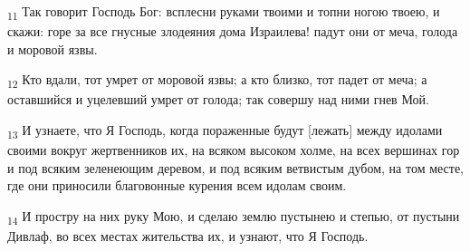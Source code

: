 \begin{tcolorbox}
\textsubscript{11} Так говорит Господь Бог: всплесни руками твоими и топни ногою твоею, и скажи: горе за все гнусные злодеяния дома Израилева! падут они от меча, голода и моровой язвы.
\end{tcolorbox}
\begin{tcolorbox}
\textsubscript{12} Кто вдали, тот умрет от моровой язвы; а кто близко, тот падет от меча; а оставшийся и уцелевший умрет от голода; так совершу над ними гнев Мой.
\end{tcolorbox}
\begin{tcolorbox}
\textsubscript{13} И узнаете, что Я Господь, когда пораженные будут [лежать] между идолами своими вокруг жертвенников их, на всяком высоком холме, на всех вершинах гор и под всяким зеленеющим деревом, и под всяким ветвистым дубом, на том месте, где они приносили благовонные курения всем идолам своим.
\end{tcolorbox}
\begin{tcolorbox}
\textsubscript{14} И простру на них руку Мою, и сделаю землю пустынею и степью, от пустыни Дивлаф, во всех местах жительства их, и узнают, что Я Господь.
\end{tcolorbox}
